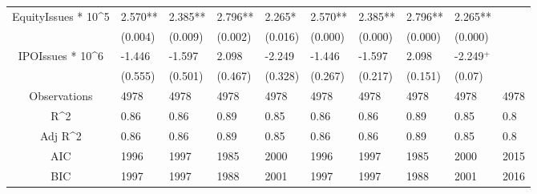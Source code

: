 \documentclass{article}
\begin{document}
\begin{table}[H]
\begin{tabular}{|clllllllll|}
  EquityIssues * 10^5 & 2.570** & 2.385** & 2.796** & 2.265* & 2.570** & 2.385** & 2.796** & 2.265** &  \\ 
   & (0.004) & (0.009) & (0.002) & (0.016) & (0.000) & (0.000) & (0.000) & (0.000) &  \\ 
  IPOIssues * 10^6 & -1.446 & -1.597 & 2.098 & -2.249 & -1.446 & -1.597 & 2.098 & -2.249$^{+}$ &  \\ 
   & (0.555) & (0.501) & (0.467) & (0.328) & (0.267) & (0.217) & (0.151) & (0.07) &  \\ 
  \hline 
 Observations & 4978 & 4978 & 4978 & 4978 & 4978 & 4978 & 4978 & 4978 & 4978 \\ 
  R^2 & 0.86 & 0.86 & 0.89 & 0.85 & 0.86 & 0.86 & 0.89 & 0.85 & 0.8 \\ 
  Adj R^2 & 0.86 & 0.86 & 0.89 & 0.85 & 0.86 & 0.86 & 0.89 & 0.85 & 0.8 \\ 
  AIC & 1996 & 1997 & 1985 & 2000 & 1996 & 1997 & 1985 & 2000 & 2015 \\ 
  BIC & 1997 & 1997 & 1988 & 2001 & 1997 & 1997 & 1988 & 2001 & 2016 \\ 
   \hline
\end{tabular}
 
\end{table}
\end{document}
